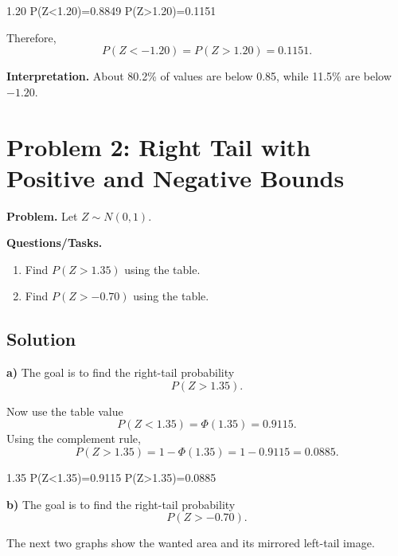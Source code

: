 	\StandardNormalComplementMirrorGraph
	{1.20}
	{P(Z<1.20)=0.8849}
	{P(Z>1.20)=0.1151}
	
	Therefore,
	\[
	P(Z<-1.20)=P(Z>1.20)=0.1151.
	\]
	
	\textbf{Interpretation.} About 80.2\% of values are below 0.85, while 11.5\% are below \(-1.20\).
	
	\section{Problem 2: Right Tail with Positive and Negative Bounds}
	\textbf{Problem.} Let \(Z\sim N(0,1)\).
	
	\textbf{Questions/Tasks.}
	\begin{enumerate}[label=\textbf{\alph*)}]
		\item Find \(P(Z>1.35)\) using the table.
		\item Find \(P(Z>-0.70)\) using the table.
	\end{enumerate}
	
	\subsection*{Solution}
	
	\textbf{a)}
	The goal is to find the right-tail probability
	\[
	P(Z>1.35).
	\]
	
	
	Now use the table value
	\[
	P(Z<1.35)=\Phi(1.35)=0.9115.
	\]
	Using the complement rule,
	\[
	P(Z>1.35)=1-\Phi(1.35)=1-0.9115=0.0885.
	\]
	
	\StandardNormalComplementMirrorGraph
	{1.35}
	{P(Z<1.35)=0.9115}
	{P(Z>1.35)=0.0885}
	
	\textbf{b)}
	The goal is to find the right-tail probability
	\[
	P(Z>-0.70).
	\]
	
	The next two graphs show the wanted area and its mirrored left-tail image.
	
	\begin{center}
		\begin{minipage}{0.48\textwidth}
			\centering
		\end{minipage}
		\hfill
		\begin{minipage}{0.48\textwidth}
			\centering
		\end{minipage}
	\end{center}
	
